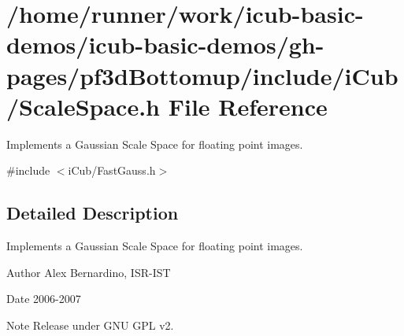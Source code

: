 \section{/home/runner/work/icub-\/basic-\/demos/icub-\/basic-\/demos/gh-\/pages/pf3d\+Bottomup/include/i\+Cub/\+Scale\+Space.h File Reference}
\label{ScaleSpace_8h}


Implements a Gaussian Scale Space for floating point images.  


{\ttfamily \#include $<$i\+Cub/\+Fast\+Gauss.\+h$>$}\newline


\subsection{Detailed Description}
Implements a Gaussian Scale Space for floating point images. 

\begin{DoxyAuthor}{Author}
Alex Bernardino, I\+S\+R-\/\+I\+ST 
\end{DoxyAuthor}
\begin{DoxyDate}{Date}
2006-\/2007 
\end{DoxyDate}
\begin{DoxyNote}{Note}
Release under G\+NU G\+PL v2. 
\end{DoxyNote}
